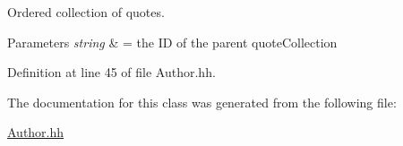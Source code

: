Ordered collection of quotes. 


\begin{DoxyParams}{Parameters}
{\em string} & = the I\-D of the parent quote\-Collection \\
\hline
\end{DoxyParams}


Definition at line 45 of file Author.\-hh.



The documentation for this class was generated from the following file\-:\begin{DoxyCompactItemize}
\item 
\hyperlink{_author_8hh}{Author.\-hh}\end{DoxyCompactItemize}
